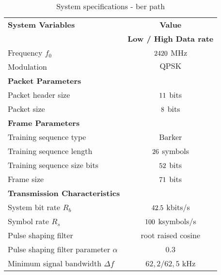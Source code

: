 \begin{table}[htbp]
  \centering
  \caption{System specifications - ber path}
    \begin{tabular}{lc}
    \rowcolor[rgb]{ 0,  0,  0} \textcolor[rgb]{ 1,  1,  1}{\textbf{System Variables}}	& \textcolor[rgb]{ 1,  1,  1}{\textbf{Value}} 		\\
    \rowcolor[rgb]{ 0,  0,  0} \textcolor[rgb]{ 1,  1,  1}{} & \textcolor[rgb]{ 1,  1,  1}{\textbf{Low / High Data rate}} 				\\
    	Frequency $f_0$ 								& $2420$ MHz 							\\
    	Modulation 									& $\text{QPSK}$									\\
	
    \rowcolor[rgb]{ 0,  0,  0} \textcolor[rgb]{ 1,  1,  1}{\textbf{Packet Parameters}} & \textcolor[rgb]{ 1,  1,  1}{} 				\\
	Packet header size      							& $11 $  bits								\\
    	Packet size									& $8$  bits					 			\\
    
    \rowcolor[rgb]{ 0,  0,  0} \textcolor[rgb]{ 1,  1,  1}{\textbf{Frame Parameters}} & \textcolor[rgb]{ 1,  1,  1}{} 				\\
    	Training sequence type 							& Barker										 	\\
    	Training sequence length							& $26$ symbols 					 		\\
   	Training sequence size bits 						& $52$ bits	 							\\
    	Frame size 									& $71$ bits								\\
    	
    \rowcolor[rgb]{ 0,  0,  0} \textcolor[rgb]{ 1,  1,  1}{\textbf{Transmission Characteristics}} & \textcolor[rgb]{ 1,  1,  1}{} 		\\
    	System bit rate $R_b$ 							& $42.5$ kbits/s 							\\
    	Symbol rate $R_s$ 								& $100$ ksymbols/s 						\\
    	Pulse shaping filter 								& root raised cosine 									\\
    	Pulse shaping filter parameter $\alpha$ 				& 0.3 											\\
    	Minimum signal bandwidth $\Delta f$ 				& $62,2 / 62,5$ kHz 									\\
    \end{tabular}
  \label{tab:specs_ber}
\end{table}
